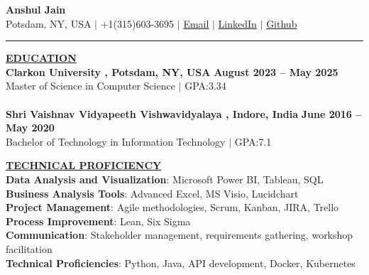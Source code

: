 \documentclass{article}
\begin{document}
\begin{center}
\thispagestyle{empty}
\large \textbf{\textbf{Anshul Jain}  \\}
\normalsize Potsdam, NY, USA $\mid$ +1(315)603-3695 $\mid$ \href{mailto:anshulj07@gmail.com}{Email} $\mid$ \href{https://www.linkedin.com/in/zanshul/}{LinkedIn} $\mid$  \href{https://github.com/anshulj07}{Github}  \\
\rule{\textwidth}{1pt}
\end{center}

\noindent \textbf{\underline{EDUCATION}} \\
\noindent \textbf{Clarkon University , Potsdam, NY, USA} \hfill \textbf{August 2023 – May 2025} \\
Master of Science in Computer Science $\mid$ GPA:3.34\\\\
\noindent \textbf{Shri Vaishnav Vidyapeeth Vishwavidyalaya , Indore, India}  \hfill \textbf{June 2016 – May 2020}  \\
Bachelor of Technology in Information Technology $\mid$ GPA:7.1

\vspace{2mm}

\noindent \textbf{\underline{TECHNICAL PROFICIENCY}} \\
\noindent
\noindent
\textbf{Data Analysis and Visualization}: Microsoft Power BI, Tableau, SQL\\
\noindent
\textbf{Business Analysis Tools}: Advanced Excel, MS Visio, Lucidchart\\
\noindent
\textbf{Project Management}: Agile methodologies, Scrum, Kanban, JIRA, Trello\\
\noindent
\textbf{Process Improvement}: Lean, Six Sigma\\
\noindent
\textbf{Communication}: Stakeholder management, requirements gathering, workshop facilitation\\
\noindent
\textbf{Technical Proficiencies}: Python, Java, API development, Docker, Kubernetes

\vspace{2mm}
\end{document}
